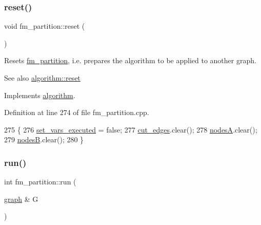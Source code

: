 \subsubsection{\texorpdfstring{reset()}{reset()}}
{\footnotesize\ttfamily void fm\+\_\+partition\+::reset (\begin{DoxyParamCaption}{ }\end{DoxyParamCaption})\hspace{0.3cm}{\ttfamily [virtual]}}

Resets \mbox{\hyperlink{classfm__partition}{fm\+\_\+partition}}, i.\+e. prepares the algorithm to be applied to another graph.

\begin{DoxySeeAlso}{See also}
\mbox{\hyperlink{classalgorithm_a21aba63d066ae7897de6ca7d8425c408}{algorithm\+::reset}} 
\end{DoxySeeAlso}


Implements \mbox{\hyperlink{classalgorithm_a21aba63d066ae7897de6ca7d8425c408}{algorithm}}.



Definition at line 274 of file fm\+\_\+partition.\+cpp.


\begin{DoxyCode}
275 \{
276     \mbox{\hyperlink{classfm__partition_a58edb78c4da479cd790da1eed1a30eab}{set\_vars\_executed}} = \textcolor{keyword}{false};
277     \mbox{\hyperlink{classfm__partition_ad71b58a8f73cc834d49304252fb4a288}{cut\_edges}}.clear();
278     \mbox{\hyperlink{classfm__partition_acdcb82ae253e8eaf75a7efca3ca2b377}{nodesA}}.clear();
279     \mbox{\hyperlink{classfm__partition_a3616b858b66682c528365a4803a4efad}{nodesB}}.clear();
280 \}
\end{DoxyCode}
\mbox{\label{classfm__partition_a015b171fcaa01973ebe6c6a46a727097}} 
\subsubsection{\texorpdfstring{run()}{run()}}
{\footnotesize\ttfamily int fm\+\_\+partition\+::run (\begin{DoxyParamCaption}\item[{\mbox{\hyperlink{classgraph}{graph}} \&}]{G }\end{DoxyParamCaption})\hspace{0.3cm}{\ttfamily [virtual]}}

